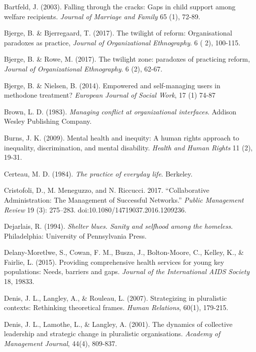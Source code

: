\label{paper1:references}
\begin{thebibliography}{99}

\item Bartfeld, J. (2003). Falling through the cracks: Gaps in child support among welfare recipients. \textit{Journal of Marriage and Family} 65 (1), 72-89.
\item Bjerge, B. \& Bjerregaard, T. (2017). The twilight of reform: Organisational paradoxes as practice, \textit{Journal of Organizational Ethnography}. 6 ( 2), 100-115.
\item Bjerge, B. \& Rowe, M. (2017). The twilight zone: paradoxes of practicing reform, \textit{Journal of Organizational Ethnography}. 6 (2), 62-67.
\item Bjerge, B. \& Nielsen, B. (2014). Empowered and self-managing users in methodone treatment? \textit{European Journal of Social Work}, 17 (1) 74-87
\item Brown, L. D. (1983). \textit{Managing conflict at organizational interfaces}. Addison Wesley Publishing Company.
\item Burns, J. K. (2009). Mental health and inequity: A human rights approach to inequality, discrimination, and mental disability. \textit{Health and Human Rights} 11 (2), 19-31.
\item Certeau, M. D. (1984). \textit{The practice of everyday life}. Berkeley.
\item Cristofoli, D., M. Meneguzzo, and N. Riccucci. 2017. “Collaborative Administration: The Management of Successful Networks.” \textit{Public Management Review} 19 (3): 275–283. doi:10.1080/14719037.2016.1209236.
\item Dejarlais, R. (1994). \textit{Shelter blues. Sanity and selfhood among the homeless}. Philadelphia: University of Pennsylvania Press.
\item Delany-Moretlwe, S., Cowan, F. M., Busza, J., Bolton-Moore, C., Kelley, K., \& Fairlie, L. (2015). Providing comprehensive health services for young key populations: Needs, barriers and gaps. \textit{Journal of the International AIDS Society} 18, 19833.
\item Denis, J. L., Langley, A., \& Rouleau, L. (2007). Strategizing in pluralistic contexts: Rethinking theoretical frames. \textit{Human Relations}, 60(1), 179-215.
\item Denis, J. L., Lamothe, L., \& Langley, A. (2001). The dynamics of collective leadership and strategic change in pluralistic organisations. \textit{Academy of Management Journal}, 44(4), 809-837.

\end{thebibliography}
